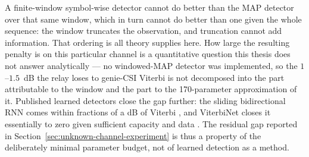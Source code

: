 A finite-window symbol-wise detector cannot do better than the MAP detector over that same window, which in turn cannot do better than one given the whole sequence: the window truncates the observation, and truncation cannot add information. That ordering is all theory supplies here. How large the resulting penalty is on this particular channel is a quantitative question this thesis does not answer analytically --- no windowed-MAP detector was implemented, so the $1$--$1.5$~dB the relay loses to genie-CSI Viterbi is not decomposed into the part attributable to the window and the part to the 170-parameter approximation of it. Published learned detectors close the gap further: the sliding bidirectional RNN comes within fractions of a dB of Viterbi \cite{FarsadGoldsmith2018NNDetection}, and ViterbiNet closes it essentially to zero given sufficient capacity and data \cite{Shlezinger2020ViterbiNet}. The residual gap reported in Section~\ref{sec:unknown-channel-experiment} is thus a property of the deliberately minimal parameter budget, not of learned detection as a method.
